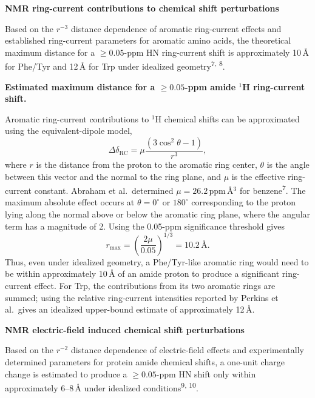\documentclass[11pt]{article}
\begin{document}
\vspace{0.4em}
\noindent\textbf{NMR ring-current contributions to chemical shift perturbations}

Based on the $r^{-3}$ distance dependence of aromatic ring-current effects and
established ring-current parameters for aromatic amino acids, the theoretical
maximum distance for a $\geq 0.05$-ppm HN ring-current shift is approximately
10\,\AA{} for Phe/Tyr and 12\,\AA{} for Trp under idealized
geometry\textsuperscript{7, 8}.

\textbf{Estimated maximum distance for a $\geq 0.05$-ppm amide $^{1}$H ring-current shift.}

Aromatic ring-current contributions to $^{1}$H chemical shifts can be
approximated using the equivalent-dipole model,
\begin{equation*}
\Delta\delta_{\mathrm{RC}}=\mu\frac{(3\cos^{2}\theta-1)}{r^{3}},
\end{equation*}
where $r$ is the distance from the proton to the aromatic ring center,
$\theta$ is the angle between this vector and the normal to the ring plane, and
$\mu$ is the effective ring-current constant. Abraham et al.\ determined
$\mu = 26.2$\,ppm\,\AA{}$^{3}$ for benzene\textsuperscript{7}. The maximum absolute effect occurs
at $\theta=0^{\circ}$ or $180^{\circ}$ corresponding to the proton lying along
the normal above or below the aromatic ring plane, where the angular term has a
magnitude of 2. Using the 0.05-ppm significance threshold gives
\begin{equation*}
r_{\max}=\left(\frac{2\mu}{0.05}\right)^{1/3}=10.2\,\textrm{\AA}.
\end{equation*}
Thus, even under idealized geometry, a Phe/Tyr-like aromatic ring would need to
be within approximately 10\,\AA{} of an amide proton to produce a significant
ring-current effect. For Trp, the contributions from its two aromatic rings are
summed; using the relative ring-current intensities reported by Perkins et al.\
gives an idealized upper-bound estimate of approximately 12\,\AA{}.

\vspace{0.4em}
\noindent\textbf{NMR electric-field induced chemical shift perturbations}

Based on the $r^{-2}$ distance dependence of electric-field effects and
experimentally determined parameters for protein amide chemical shifts, a
one-unit charge change is estimated to produce a $\geq 0.05$-ppm HN shift only
within approximately 6--8\,\AA{} under idealized
conditions\textsuperscript{9, 10}.
\end{document}
